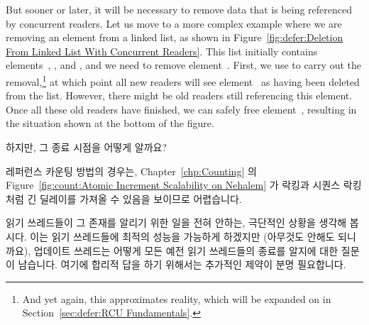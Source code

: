 But sooner or later, it will be necessary to remove data that is
being referenced by concurrent readers.
Let us move to a more complex example where we are removing an element
from a linked list, as shown in
Figure~\ref{fig:defer:Deletion From Linked List With Concurrent Readers}.
This list initially contains elements~, , and ,
and we need to remove element~.
First, we use  to carry out the removal,\footnote{
	And yet again, this approximates reality, which will be expanded
	on in Section~\ref{sec:defer:RCU Fundamentals}.}
at which point all new readers will see element~ as having been
deleted from the list.
However, there might be old readers still referencing this element.
Once all these old readers have finished, we can safely free
element~, resulting in the situation shown at the bottom of
the figure.
\fi

하지만, 그 종료 시점을 어떻게 알까요?

레퍼런스 카운팅 방법의 경우는,
Chapter~\ref{chp:Counting} 의
Figure~\ref{fig:count:Atomic Increment Scalability on Nehalem}
가 락킹과 시퀀스 락킹처럼 긴
딜레이를 가져올 수 있음을 보이므로 어렵습니다.

읽기 쓰레드들이 그 존재를 알리기 위한 일을 전혀 안하는,
극단적인 상황을 생각해 봅시다.
이는 읽기 쓰레드들에 최적의 성능을 가능하게 하겠지만
(아무것도 안해도 되니까요), 업데이트
쓰레드는 어떻게 모든 예전 읽기 쓰레드들의 종료를 알지에 대한 질문이
남습니다.
여기에 합리적 답을 하기 위해서는 추가적인 제약이 분명
필요합니다.

